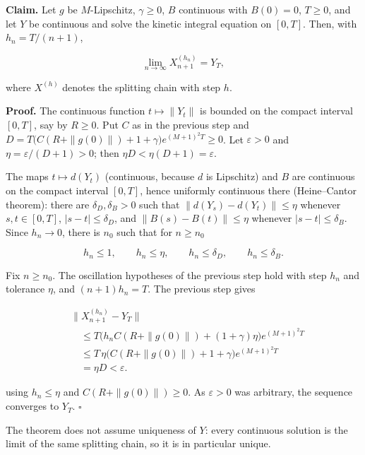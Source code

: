 \documentclass[11pt,a4paper]{article}
\begin{document}
\textbf{Claim.} Let \(g\) be \(M\)-Lipschitz, \(\gamma\ge0\), \(B\) continuous with \(B(0)=0\), \(T\ge0\), and let \(Y\) be continuous and solve the kinetic integral equation on \([0,T]\). Then, with \(h_n=T/(n+1)\),


\[\lim_{n\to\infty}X^{(h_n)}_{n+1}=Y_T,\]


where \(X^{(h)}\) denotes the splitting chain with step \(h\).




\textbf{Proof.} The continuous function \(t\mapsto\|Y_t\|\) is bounded on the compact interval \([0,T]\), say by \(R\ge0\). Put \(C\) as in the previous step and \(D=T\bigl(C(R+\|g(0)\|)+1+\gamma\bigr)e^{(M+1)^2T}\ge0\). Let \(\varepsilon>0\) and \(\eta=\varepsilon/(D+1)>0\); then \(\eta D<\eta(D+1)=\varepsilon\).




The maps \(t\mapsto d(Y_t)\) (continuous, because \(d\) is Lipschitz) and \(B\) are continuous on the compact interval \([0,T]\), hence uniformly continuous there (Heine–Cantor theorem): there are \(\delta_D,\delta_B>0\) such that \(\|d(Y_s)-d(Y_t)\|\le\eta\) whenever \(s,t\in[0,T]\), \(|s-t|\le\delta_D\), and \(\|B(s)-B(t)\|\le\eta\) whenever \(|s-t|\le\delta_B\). Since \(h_n\to0\), there is \(n_0\) such that for \(n\ge n_0\)


\[h_n\le1,\qquad h_n\le\eta,\qquad h_n\le\delta_D,\qquad h_n\le\delta_B .\]


Fix \(n\ge n_0\). The oscillation hypotheses of the previous step hold with step \(h_n\) and tolerance \(\eta\), and \((n+1)h_n=T\). The previous step gives


\[\begin{aligned}
&\|X^{(h_n)}_{n+1}-Y_T\|\\
&\quad\le T\bigl(h_nC(R+\|g(0)\|)+(1+\gamma)\eta\bigr)e^{(M+1)^2T}\\
&\quad\le T\,\eta\bigl(C(R+\|g(0)\|)+1+\gamma\bigr)e^{(M+1)^2T}\\
&\quad=\eta D<\varepsilon.
\end{aligned}\]


using \(h_n\le\eta\) and \(C(R+\|g(0)\|)\ge0\). As \(\varepsilon>0\) was arbitrary, the sequence converges to \(Y_T\). \(\square\)




The theorem does not assume uniqueness of \(Y\): every continuous solution is the limit of the same splitting chain, so it is in particular unique.
\end{document}
